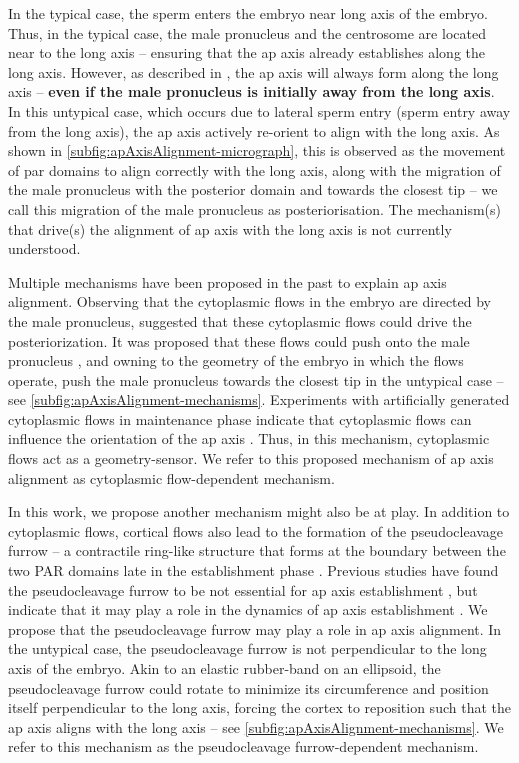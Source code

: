 In the typical case, the sperm enters the embryo near long axis of the embryo. Thus, in the typical case, the male pronucleus and the centrosome are located near to the long axis -- ensuring that the \ac{ap} axis already establishes along the long axis. However, as described in \cite{goldstein1996specification}, the \ac{ap} axis will always form along the long axis -- \textbf{even if the male pronucleus is initially away from the long axis}. In this untypical case, which occurs due to lateral sperm entry (sperm entry away from the long axis), the \ac{ap} axis actively re-orient to align with the long axis. As shown in \autoref{subfig:apAxisAlignment-micrograph}, this is observed as the movement of \ac{par} domains to align correctly with the long axis, along with the migration of the male pronucleus with the posterior domain and towards the closest tip \citep{goldstein1996specification} -- we call this migration of the male pronucleus as posteriorisation. The mechanism(s) that drive(s) the alignment of \ac{ap} axis with the long axis is not currently understood.

Multiple mechanisms have been proposed in the past to explain \ac{ap} axis alignment. Observing that the cytoplasmic flows in the embryo are directed by the male pronucleus, \cite{goldstein1996specification} suggested that these cytoplasmic flows could drive the posteriorization. It was proposed that these flows could push onto the male pronucleus \citep{kimuraCytoplasmicFlows}, and owning to the geometry of the embryo in which the flows operate, push the male pronucleus towards the closest tip in the untypical case \citep{goldstein1996specification} -- see \autoref{subfig:apAxisAlignment-mechanisms}. Experiments with artificially generated cytoplasmic flows in maintenance phase indicate that cytoplasmic flows can influence the orientation of the \ac{ap} axis \citep{mittasch2018non}. Thus, in this mechanism, cytoplasmic flows act as a geometry-sensor. We refer to this proposed mechanism of \ac{ap} axis alignment as cytoplasmic flow-dependent mechanism. 

In this work, we propose another mechanism might also be at play. In addition to cytoplasmic flows, cortical flows also lead to the formation of the pseudocleavage furrow -- a contractile ring-like structure that forms at the boundary between the two PAR domains late in the establishment phase \citep{nigon1960architecture,reymann2016cortical}. Previous studies have found the pseudocleavage furrow to be not essential for \ac{ap} axis establishment \citep{rose1995pseudocleavage}, but indicate that it may play a role in the dynamics of \ac{ap} axis establishment \citep{aras2018importance}. We propose that the pseudocleavage furrow may play a role in \ac{ap} axis alignment. In the untypical case, the pseudocleavage furrow is not perpendicular to the long axis of the embryo. Akin to an elastic rubber-band on an ellipsoid, the pseudocleavage furrow could rotate to minimize its circumference and position itself perpendicular to the long axis, forcing the cortex to reposition such that the \ac{ap} axis aligns with the long axis  -- see \autoref{subfig:apAxisAlignment-mechanisms}. We refer to this mechanism as the pseudocleavage furrow-dependent mechanism. 

